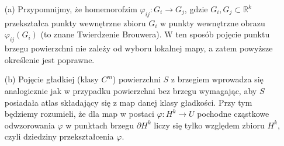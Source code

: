 \documentclass[leqno]{article}
\begin{document}
\begin{justify}
\begin{uwaga}
    \begin{itemize}
        \item [(a)] Przypomnijmy, że homemorofzim $\varphi_{ij} : G_i \to G_j$, gdzie $G_i, G_j \subset \mathbb{R}^k$ przekształca 
            punkty wewnętrzne zbioru $G_i$ w punkty wewnętrzne obrazu $\varphi_{ij}(G_i)$ (to znane Twierdzenie Brouwera). 
            W ten sposób pojęcie punktu brzegu powierzchni nie zależy od wyboru lokalnej mapy, a zatem powyższe określenie jest poprawne. 
        \item [(b)]
            Pojęcie gładkiej (klasy $C^m$) powierzchni $S$ z brzegiem wprowadza się analogicznie jak w przypadku powierzchni bez brzegu wymagając, aby $S$
            posiadała atlas składający się z map danej klasy gładkości. Przy tym będziemy rozumieli, że dla map w postaci $\varphi : H^k \to U$
            pochodne cząstkowe odwzorowania $\varphi$ w punktach brzegu $\partial H^k$ liczy się tylko względem zbioru $H^k$, czyli dziedziny przekształcenia $\varphi$. 
    \end{itemize}
\end{uwaga}



\end{justify}
\end{document}
